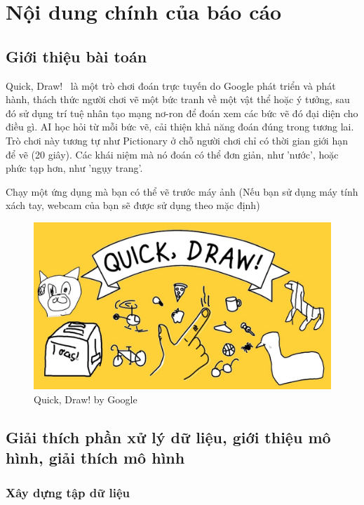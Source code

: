 
\chapter{Nội dung chính của báo cáo}
\label{Chapter2}

\section{Giới thiệu bài toán}

Quick, Draw!~\cite{wiki} là một trò chơi đoán trực tuyến do Google phát triển và phát hành, thách thức người chơi vẽ một bức tranh về một vật thể hoặc ý tưởng, sau đó sử dụng trí tuệ nhân tạo mạng nơ-ron để đoán xem các bức vẽ đó đại diện cho điều gì. AI học hỏi từ mỗi bức vẽ, cải thiện khả năng đoán đúng trong tương lai. Trò chơi này tương tự như Pictionary ở chỗ người chơi chỉ có thời gian giới hạn để vẽ (20 giây). Các khái niệm mà nó đoán có thể đơn giản, như 'nước', hoặc phức tạp hơn, như 'ngụy trang'.

Chạy một ứng dụng mà bạn có thể vẽ trước máy ảnh (Nếu bạn sử dụng máy tính xách tay, webcam của bạn sẽ được sử dụng theo mặc định) 


\begin{figure}[H]  %
    \centering
    \includegraphics[width=1.0\linewidth]{Chapter2/Quick,_Draw!.jpg}
    \caption{Quick, Draw! by Google}
    \label{fig:baitoan}
\end{figure}

\section{Giải thích phần xử lý dữ liệu, giới thiệu mô hình, giải thích mô hình}

\subsection{Xây dựng tập dữ liệu} \label{sec:subsection221}

